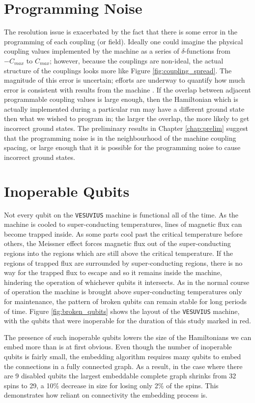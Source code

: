 \section{Programming Noise}
\label{sec:noise}
The resolution issue is exacerbated by the fact that there is some error in the programming of each coupling (or field).  Ideally one could imagine the physical coupling values implemented by the machine as a series of $\delta$-functions from $-C_{max}$ to $C_{max}$; however, because the couplings are non-ideal, the actual structure of the couplings looks more like Figure \ref{fig:coupling_spread}.  The magnitude of this error is uncertain; efforts are underway to quantify how much error is consistent with results from the machine \cite{aaron}.  If the overlap between adjacent programmable coupling values is large enough, then the Hamiltonian which is actually implemented during a particular run may have a different ground state then what we wished to program in; the larger the overlap, the more likely to get incorrect ground states.  The preliminary results in Chapter \ref{chap:prelim} suggest that the programming noise is in the neighbourhood of the machine coupling spacing, or large enough that it is possible for the programming noise to cause incorrect ground states.

\section{Inoperable Qubits}
Not every qubit on the \texttt{VESUVIUS} machine is functional all of the time.  As the machine is cooled to super-conducting temperatures, lines of magnetic flux can become trapped inside.  As some parts cool past the critical temperature before others, the Meissner effect forces magnetic flux out of the super-conducting regions into the regions which are still above the critical temperature.  If the regions of trapped flux are surrounded by super-conducting regions, there is no way for the trapped flux to escape and so it remains inside the machine, hindering the operation of whichever qubits it intersects.  As in the normal course of operation the machine is brought above super-conducting temperatures only for maintenance, the pattern of broken qubits can remain stable for long periods of time.  Figure \ref{fig:broken_qubits} shows the layout of the \texttt{VESUVIUS} machine, with the qubits that were inoperable for the duration of this study marked in red.

The presence of such inoperable qubits lowers the size of the Hamiltonians we can embed more than is at first obvious.  Even though the number of inoperable qubits is fairly small, the embedding algorithm requires many qubits to embed the connections in a fully connected graph.  As a result, in the case where there are 9 disabled qubits the largest embeddable complete graph shrinks from 32 spins to 29, a 10\% decrease in size for losing only 2\% of the spins.  This demonstrates how reliant on connectivity the embedding process is.

